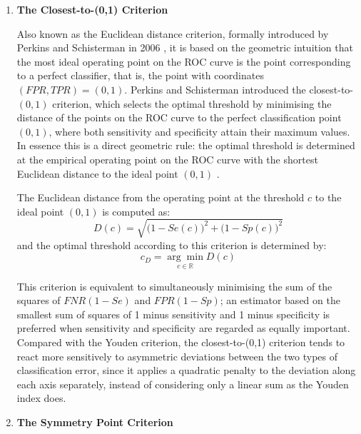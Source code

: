 \begin{enumerate}[label=\alph*)]
    
    \vspace{1em}
    \item \textbf{The Closest-to-(0,1) Criterion}

    Also known as the Euclidean distance criterion, formally introduced by Perkins and Schisterman in 2006  \cite{perkins2006inconsistency}, it is based on the geometric intuition that the most ideal operating point on the ROC curve is the point corresponding to a perfect classifier, that is, the point with coordinates $(FPR, TPR) = (0,1)$. Perkins and Schisterman introduced the closest-to-$(0,1)$ criterion, which selects the optimal threshold by minimising the distance of the points on the ROC curve to the perfect classification point $(0,1)$, where both sensitivity and specificity attain their maximum values. In essence this is a direct geometric rule: the optimal threshold is determined at the empirical operating point on the ROC curve with the shortest Euclidean distance to the ideal point $(0,1)$ \cite{ghosal2025impact}.

    \vspace{1em}
    \hspace{0.5cm} The Euclidean distance from the operating point at the threshold $c$ to the ideal point $(0,1)$ is computed as:
    \begin{equation}
        D(c) = \sqrt{\big(1 - Se(c)\big)^2 + \big(1 - Sp(c)\big)^2}
    \end{equation}
    and the optimal threshold according to this criterion is determined by:
    \begin{equation}
        c_{D} = \underset{c \in \mathbb{R}}{\arg\min} D(c)
    \end{equation}
    
    \hspace{0.5cm} This criterion is equivalent to simultaneously minimising the sum of the squares of $FNR (1-Se)$ and $FPR (1 - Sp)$; an estimator based on the smallest sum of squares of 1 minus sensitivity and 1 minus specificity is preferred when sensitivity and specificity are regarded as equally important. Compared with the Youden criterion, the closest-to-(0,1) criterion tends to react more sensitively to asymmetric deviations between the two types of classification error, since it applies a quadratic penalty to the deviation along each axis separately, instead of considering only a linear sum as the Youden index does.
    
    \vspace{1em}
    \item \textbf{The Symmetry Point Criterion}


\end{enumerate}
